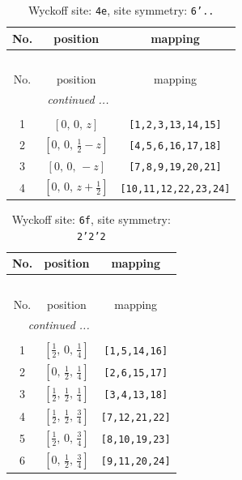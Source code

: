 \documentclass[fleqn,8pt]{jsarticle}
\begin{document}
\renewcommand{\arraystretch}{1.2}
\begin{longtable}{ccc}
\caption{Wyckoff site: {\tt 4e}, site symmetry: {\tt 6'..}}
 \\
 \hline \hline
No. & position & mapping \\ \hline \endfirsthead

\multicolumn{2}{l}{\tablename\ \thetable{}} \\
 \hline \hline
No. & position & mapping \\ \hline \endhead

 \hline \hline
\multicolumn{2}{r}{\footnotesize\it continued ...} \\ \endfoot

 \hline \hline
\multicolumn{2}{r}{} \\ \endlastfoot

1 & $\left[ 0,\, 0,\, z \right]$ & {\tt [1,2,3,13,14,15]} \\ \hline
2 & $\left[ 0,\, 0,\, \frac{1}{2} - z \right]$ & {\tt [4,5,6,16,17,18]} \\ \hline
3 & $\left[ 0,\, 0,\, - z \right]$ & {\tt [7,8,9,19,20,21]} \\ \hline
4 & $\left[ 0,\, 0,\, z + \frac{1}{2} \right]$ & {\tt [10,11,12,22,23,24]} \\
\end{longtable}
\renewcommand{\arraystretch}{1.2}
\begin{longtable}{ccc}
\caption{Wyckoff site: {\tt 6f}, site symmetry: {\tt 2'2'2}}
 \\
 \hline \hline
No. & position & mapping \\ \hline \endfirsthead

\multicolumn{2}{l}{\tablename\ \thetable{}} \\
 \hline \hline
No. & position & mapping \\ \hline \endhead

 \hline \hline
\multicolumn{2}{r}{\footnotesize\it continued ...} \\ \endfoot

 \hline \hline
\multicolumn{2}{r}{} \\ \endlastfoot

1 & $\left[ \frac{1}{2},\, 0,\, \frac{1}{4} \right]$ & {\tt [1,5,14,16]} \\ \hline
2 & $\left[ 0,\, \frac{1}{2},\, \frac{1}{4} \right]$ & {\tt [2,6,15,17]} \\ \hline
3 & $\left[ \frac{1}{2},\, \frac{1}{2},\, \frac{1}{4} \right]$ & {\tt [3,4,13,18]} \\ \hline
4 & $\left[ \frac{1}{2},\, \frac{1}{2},\, \frac{3}{4} \right]$ & {\tt [7,12,21,22]} \\ \hline
5 & $\left[ \frac{1}{2},\, 0,\, \frac{3}{4} \right]$ & {\tt [8,10,19,23]} \\ \hline
6 & $\left[ 0,\, \frac{1}{2},\, \frac{3}{4} \right]$ & {\tt [9,11,20,24]} \\
\end{longtable}
\end{document}
